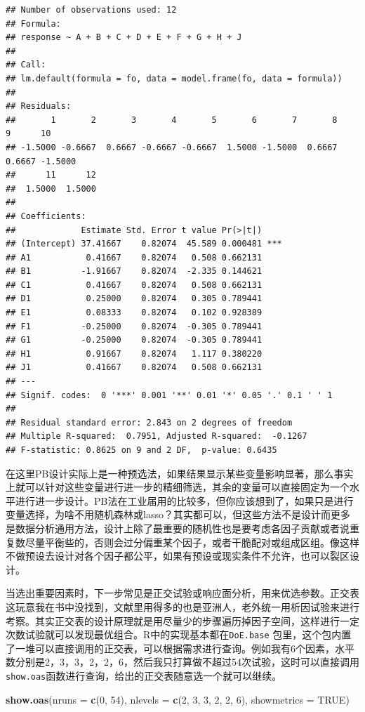 \documentclass[]{tufte-book}
\newenvironment{Shaded}{}{}
\newcommand{\DataTypeTok}[1]{\textcolor[rgb]{0.56,0.13,0.00}{#1}}
\newcommand{\DecValTok}[1]{\textcolor[rgb]{0.25,0.63,0.44}{#1}}
\newcommand{\KeywordTok}[1]{\textcolor[rgb]{0.00,0.44,0.13}{\textbf{#1}}}
\newcommand{\NormalTok}[1]{#1}
\newcommand{\OtherTok}[1]{\textcolor[rgb]{0.00,0.44,0.13}{#1}}
\begin{document}
\begin{verbatim}
## Number of observations used: 12 
## Formula:
## response ~ A + B + C + D + E + F + G + H + J
## 
## Call:
## lm.default(formula = fo, data = model.frame(fo, data = formula))
## 
## Residuals:
##       1       2       3       4       5       6       7       8       9      10 
## -1.5000 -0.6667  0.6667 -0.6667 -0.6667  1.5000 -1.5000  0.6667  0.6667 -1.5000 
##      11      12 
##  1.5000  1.5000 
## 
## Coefficients:
##             Estimate Std. Error t value Pr(>|t|)    
## (Intercept) 37.41667    0.82074  45.589 0.000481 ***
## A1           0.41667    0.82074   0.508 0.662131    
## B1          -1.91667    0.82074  -2.335 0.144621    
## C1           0.41667    0.82074   0.508 0.662131    
## D1           0.25000    0.82074   0.305 0.789441    
## E1           0.08333    0.82074   0.102 0.928389    
## F1          -0.25000    0.82074  -0.305 0.789441    
## G1          -0.25000    0.82074  -0.305 0.789441    
## H1           0.91667    0.82074   1.117 0.380220    
## J1           0.41667    0.82074   0.508 0.662131    
## ---
## Signif. codes:  0 '***' 0.001 '**' 0.01 '*' 0.05 '.' 0.1 ' ' 1
## 
## Residual standard error: 2.843 on 2 degrees of freedom
## Multiple R-squared:  0.7951, Adjusted R-squared:  -0.1267 
## F-statistic: 0.8625 on 9 and 2 DF,  p-value: 0.6435
\end{verbatim}

在这里PB设计实际上是一种预选法，如果结果显示某些变量影响显著，那么事实上就可以针对这些变量进行进一步的精细筛选，其余的变量可以直接固定为一个水平进行进一步设计。PB法在工业届用的比较多，但你应该想到了，如果只是进行变量选择，为啥不用随机森林或lasso？其实都可以，但这些方法不是设计而更多是数据分析通用方法，设计上除了最重要的随机性也是要考虑各因子贡献或者说重复数尽量平衡些的，否则会过分偏重某个因子，或者干脆配对或组成区组。像这样不做预设去设计对各个因子都公平，如果有预设或现实条件不允许，也可以裂区设计。

当选出重要因素时，下一步常见是正交试验或响应面分析，用来优选参数。正交表这玩意我在书中没找到，文献里用得多的也是亚洲人，老外统一用析因试验来进行考察。其实正交表的设计原理就是用尽量少的步骤遍历掉因子空间，这样进行一定次数试验就可以发现最优组合。R中的实现基本都在\texttt{DoE.base} 包里，这个包内置了一堆可以直接调用的正交表，可以根据需求进行查询。例如我有6个因素，水平数分别是2，3，3，2，2，6，然后我只打算做不超过54次试验，这时可以直接调用\texttt{show.oas}函数进行查询，给出的正交表随意选一个就可以继续。

\begin{Shaded}
\begin{Highlighting}[]
\KeywordTok{show.oas}\NormalTok{(}\DataTypeTok{nruns =} \KeywordTok{c}\NormalTok{(}\DecValTok{0}\NormalTok{, }\DecValTok{54}\NormalTok{), }\DataTypeTok{nlevels =} \KeywordTok{c}\NormalTok{(}\DecValTok{2}\NormalTok{, }\DecValTok{3}\NormalTok{, }\DecValTok{3}\NormalTok{, }\DecValTok{2}\NormalTok{, }\DecValTok{2}\NormalTok{, }\DecValTok{6}\NormalTok{), }\DataTypeTok{showmetrics =} \OtherTok{TRUE}\NormalTok{)}
\end{Highlighting}
\end{Shaded}
\end{document}
